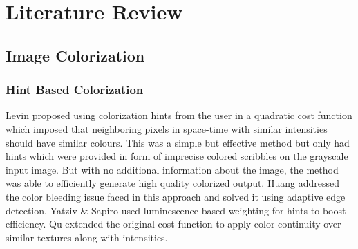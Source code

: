 \documentclass[10pt,twocolumn,letterpaper]{article}
\begin{document}
\section{Literature Review}
\subsection{Image Colorization}
\subsubsection{Hint Based Colorization}
\hspace*{0.167 in}Levin \etal\cite{levin2004colorization} proposed using colorization hints from the user in a quadratic cost function which imposed that neighboring pixels in space-time with similar intensities should have similar colours. This was a simple but effective method but only had hints which were provided in form of imprecise colored scribbles on the grayscale input image. But with no additional information about the image, the method was able to efficiently generate high quality colorized output. Huang \etal\cite{huang2005edge} addressed the color bleeding issue faced in this approach and solved it using adaptive edge detection. Yatziv \& Sapiro\cite{yatziv2006chrominance} used luminescence based weighting for hints to boost efficiency. Qu \etal\cite{qu2006manga} extended the original cost function to apply color continuity over similar textures along with intensities.
\end{document}
